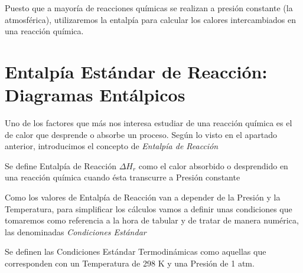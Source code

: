 Puesto que a mayoría de reacciones químicas se realizan a presión constante (la atmosférica), utilizaremos la entalpía para calcular los calores intercambiados en una reacción química.

\section{Entalpía Estándar de Reacción: Diagramas Entálpicos}

Uno de los factores que más nos interesa estudiar de una reacción química es el de calor que desprende o absorbe un proceso. Según lo visto en el apartado anterior, introducimos el concepto de \emph{Entalpía de Reacción}

\begin{definition}
	
	Se define Entalpía de Reacción $\Delta H_r$ como el calor absorbido o desprendido en una reacción química cuando ésta transcurre a Presión constante
	
\end{definition}

Como los valores de Entalpía de Reacción van a depender de la Presión y la Temperatura, para simplificar los cálculos vamos a definir unas condiciones que tomaremos como referencia a la hora de tabular y de tratar de manera numérica, las denominadas \emph{Condiciones Estándar}\\

\begin{Definition}
	Se definen las Condiciones Estándar Termodinámicas como aquellas que corresponden con un Temperatura  de 298 K y una Presión de 1 atm.
\end{Definition}



